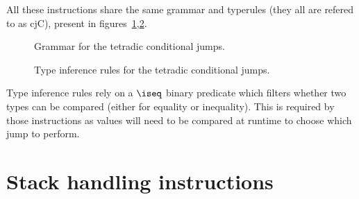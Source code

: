 All these instructions share the same grammar and typerules (they all are refered to as {\Iformat cjC}), present in figures~\ref{fig:nstar-instructionset-terminal-cjX-tetradic-grammar},\ref{fig:nstar-instructionset-terminal-cjX-tetradic-typerules}.

\begin{figure}[H]
	\centering


	\caption{Grammar for the tetradic conditional jumps.}
	\label{fig:nstar-instructionset-terminal-cjX-tetradic-grammar}
\end{figure}

\begin{figure}[H]
	\centering


	\caption{Type inference rules for the tetradic conditional jumps.}
	\label{fig:nstar-instructionset-terminal-cjX-tetradic-typerules}
\end{figure}

Type inference rules rely on a $\iseq$ binary predicate which filters whether two types can be compared (either for equality or inequality).
This is required by those instructions as values will need to be compared at runtime to choose which jump to perform.

\section{Stack handling instructions}\label{sec:nstar-instructionset-stack}

